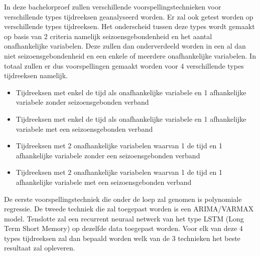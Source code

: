In deze bachelorproef zullen verschillende voorspellingstechnieken voor verschillende types tijdreeksen geanalyseerd worden. Er zal ook getest worden op verschillende types tijdreeksen. Het onderscheid tussen deze types wordt gemaakt op basis van 2 criteria namelijk seizoensgebondenheid en het aantal onafhankelijke variabelen. Deze zullen dan onderverdeeld worden in een al dan niet seizoensgebondenheid en een enkele of meerdere onafhankelijke variabelen. In totaal zullen er dus voorspellingen gemaakt worden voor 4 verschillende types tijdreeksen namelijk.
\begin{itemize}
    \item Tijdreeksen met enkel de tijd als onafhankelijke variabele en 1 afhankelijke variabele zonder seizoensgebonden verband
    \item Tijdreeksen met enkel de tijd als onafhankelijke variabele en 1 afhankelijke variabele met een seizoensgebonden verband
    \item Tijdreeksen met 2 onafhankelijke variabelen waarvan 1 de tijd en 1 afhankelijke variabele zonder een seizoensgebonden verband
    \item Tijdreeksen met 2 onafhankelijke variabelen waarvan 1 de tijd en 1 afhankelijke variabele met een seizoensgebonden verband
\end{itemize}
 De eerste voorspellingstechniek die onder de loep zal genomen is polynomiale regressie. De tweede techniek die zal toegepast worden is een
 ARIMA/VARMAX model. Tenslotte zal een  recurrent neuraal netwerk van het type LSTM (Long Term Short Memory) op dezelfde data toegepast worden. Voor elk van deze 4 types tijdreeksen zal dan bepaald worden welk van de 3 technieken het beste resultaat zal opleveren.

